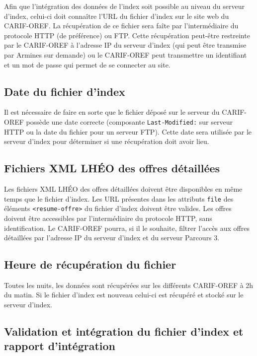 \documentclass[a4paper]{report}
\begin{document}
Afin que l'intégration des données de l'index soit possible au niveau
du serveur d'index, celui-ci doit connaître l'URL du fichier d'index
sur le site web du CARIF-OREF. La récupération de ce fichier sera
faîte par l'intermédiaire du protocole HTTP (de préférence) ou
FTP. Cette récupération peut-être restreinte par le CARIF-OREF à
l'adresse IP du serveur d'index (qui peut être transmise par Armines
sur demande) ou le CARIF-OREF peut transmettre un identifiant et un
mot de passe qui permet de se connecter au site.

\subsection{Date du fichier d'index}

Il est nécessaire de faire en sorte que le fichier déposé sur le
serveur du CARIF-OREF possède une date correcte (composante
\texttt{Last-Modified:} sur serveur HTTP ou la date du fichier pour un
serveur FTP). Cette date sera utilisée par le serveur d'index pour
déterminer si une récupération doit avoir lieu.

\subsection{Fichiers XML LHÉO des offres détaillées}

Les fichiers XML LHÉO des offres détaillées doivent être disponibles
en même temps que le fichier d'index. Les URL présentes dans les
attributs \texttt{file} des éléments \texttt{<resume-offre>} du
fichier d'index doivent être valides. Les offres doivent être
accessibles par l'intermédiaire du protocole HTTP, sans
identification. Le CARIF-OREF pourra, si il le souhaite, filtrer
l'accès aux offres détaillées par l'adresse IP du serveur d'index et
du serveur Parcours 3.

\subsection{Heure de récupération du fichier}

Toutes les nuits, les données sont récupérées sur les différents
CARIF-OREF à 2h du matin. Si le fichier d'index est nouveau celui-ci
est récupéré et stocké sur le serveur d'index.

\subsection{Validation et intégration du fichier d'index et rapport d'intégration}
\end{document}
